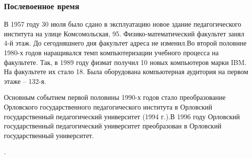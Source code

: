 \documentclass[pdf,hyperref={unicode}, aspectratio=43, serif,11pt]{beamer}
\begin{document}
\begin{frame}
\frametitle{Послевоенное время}
\tiny{
В 1957 году 30 июля было сдано в эксплуатацию новое здание педагогического института на улице Комсомольская, 95. Физико-математический факультет занял 4-й этаж. До сегодняшнего дня факультет адреса не изменил.Во второй половине 1980-х годов наращивался темп компьютеризации учебного процесса на факультете. Так, в 1989 году физмат получил 10 новых компьютеров марки IBM. На факультете их стало 18. Была оборудована компьютерная аудитория на первом этаже – 132-я.

Основным событием первой половины 1990-х годов стало преобразование Орловского государственного педагогического института в Орловский государственный педагогический университет (1994 г.).В 1996 году Орловский государственный педагогический университет преобразован в Орловский государственный университет.

.}
\begin{figure}[!h]
\centering
{}
\end{figure}


\end{frame}
\end{document}
